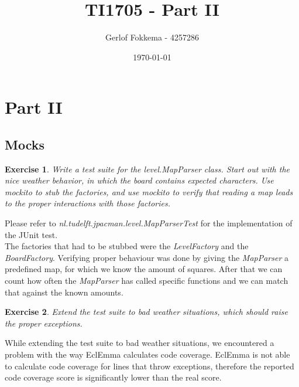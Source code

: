 \documentclass[a4paper]{article}
\title{TI1705 - Part II}
\author{Gerlof Fokkema - 4257286}
\date{\today}
\newtheorem{thm}{Exercise}
\begin{document}
  \maketitle
  \section{Part II}
  
  \subsection{Mocks}
    \begin{thm}
      Write a test suite for the level.MapParser class. Start out with the nice
      weather behavior, in which the board contains expected characters. Use mockito
      to stub the factories, and use mockito to verify that reading a map leads to the
      proper interactions with those factories.
    \end{thm}
    Please refer to \textit{nl.tudelft.jpacman.level.MapParserTest} for the implementation of the JUnit test. \\
    The factories that had to be stubbed were the \textit{LevelFactory} and the \textit{BoardFactory}.
    Verifying proper behaviour was done by giving the \textit{MapParser} a predefined map, for which we know the amount of squares.
    After that we can count how often the \textit{MapParser} has called specific functions and we can match that against the known amounts.

    \begin{thm}
      Extend the test suite to bad weather situations,
      which should raise the proper exceptions.
    \end{thm}
    While extending the test suite to bad weather situations, we encountered a problem with the way EclEmma calculates code coverage.
    EclEmma is not able to calculate code coverage for lines that throw exceptions, therefore the reported code coverage score is significantly lower than the real score.
  
  \newpage
\end{document}
